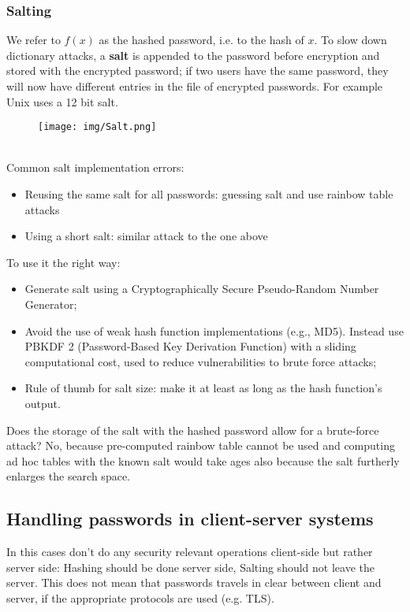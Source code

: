 \documentclass[a4paper, 10pt, titlepage]{article}
\begin{document}
\subsubsection{Salting}
We refer to $f(x)$ as the hashed password, i.e. to the hash of $x$. To slow down dictionary attacks, a \textbf{salt} is appended to the password before encryption and stored with the encrypted password; if two users have the same password, they will now have different entries in the file of encrypted passwords. For example Unix uses a 12 bit salt.
\begin{figure}[h]
\centering
\texttt{[image: img/Salt.png]}
\end{figure}\\
Common salt implementation errors:
\begin{itemize}
\item Reusing the same salt for all passwords: guessing salt and use rainbow table attacks
\item Using a short salt: similar attack to the one above
\end{itemize}
To use it the right way:
\begin{itemize}
\item Generate salt using a Cryptographically Secure Pseudo-Random Number Generator;
\item Avoid the use of weak hash function implementations (e.g., MD5). Instead use PBKDF 2 (Password-Based Key Derivation Function) with a sliding computational cost, used to reduce vulnerabilities to brute force attacks;
\item Rule of thumb for salt size: make it at least as long as the hash function's output.
\end{itemize}
Does the storage of the salt with the hashed password allow for a brute-force attack? No, because pre-computed rainbow table cannot
be used and computing ad hoc tables with the known salt would take ages also because the salt furtherly enlarges the search space.

\subsection{Handling passwords in client-server systems}
In this cases don’t do any security relevant operations client-side but rather server side: Hashing should be done server side, Salting should not leave the server. This does not mean that passwords travels in clear between client and server, if the appropriate protocols are used (e.g. TLS).
\end{document}
